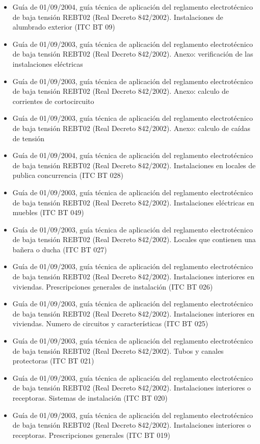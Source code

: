 \documentclass[../main.tex]{subfiles}
\begin{document}
\begin{itemize}
    \item Guía de 01/09/2004, guía técnica de aplicación del reglamento electrotécnico de baja tensión REBT02 (Real Decreto 842/2002). Instalaciones de alumbrado exterior (ITC BT 09)
    \item Guía de 01/09/2003, guía técnica de aplicación del reglamento electrotécnico de baja tensión REBT02 (Real Decreto 842/2002). Anexo: verificación de las instalaciones eléctricas
    \item Guía de 01/09/2003, guía técnica de aplicación del reglamento electrotécnico de baja tensión REBT02 (Real Decreto 842/2002). Anexo: calculo de corrientes de cortocircuito
    \item Guía de 01/09/2003, guía técnica de aplicación del reglamento electrotécnico de baja tensión REBT02 (Real Decreto 842/2002). Anexo: calculo de caídas de tensión
    \item Guía de 01/09/2004, guía técnica de aplicación del reglamento electrotécnico de baja tensión REBT02 (Real Decreto 842/2002). Instalaciones en locales de publica concurrencia (ITC BT 028)
    \item Guía de 01/09/2003, guía técnica de aplicación del reglamento electrotécnico de baja tensión REBT02 (Real Decreto 842/2002). Instalaciones eléctricas en muebles (ITC BT 049)
    \item Guía de 01/09/2003, guía técnica de aplicación del reglamento electrotécnico de baja tensión REBT02 (Real Decreto 842/2002). Locales que contienen una bañera o ducha (ITC BT 027)
    \item Guía de 01/09/2003, guía técnica de aplicación del reglamento electrotécnico de baja tensión REBT02 (Real Decreto 842/2002). Instalaciones interiores en viviendas. Prescripciones generales de instalación (ITC BT 026)
    \item Guía de 01/09/2003, guía técnica de aplicación del reglamento electrotécnico de baja tensión REBT02 (Real Decreto 842/2002). Instalaciones interiores en viviendas. Numero de circuitos y características (ITC BT 025)
    \item Guía de 01/09/2003, guía técnica de aplicación del reglamento electrotécnico de baja tensión REBT02 (Real Decreto 842/2002). Tubos y canales protectoras (ITC BT 021)
    \item Guía de 01/09/2003, guía técnica de aplicación del reglamento electrotécnico de baja tensión REBT02 (Real Decreto 842/2002). Instalaciones interiores o receptoras. Sistemas de instalación (ITC BT 020)
    \item Guía de 01/09/2003, guía técnica de aplicación del reglamento electrotécnico de baja tensión REBT02 (Real Decreto 842/2002). Instalaciones interiores o receptoras. Prescripciones generales (ITC BT 019)

\end{itemize}
\end{document}
